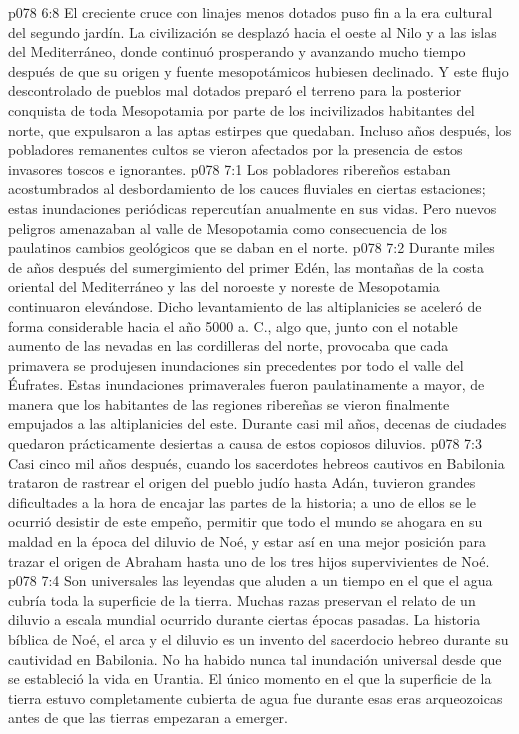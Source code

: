 \vs p078 6:8 El creciente cruce con linajes menos dotados puso fin a la era cultural del segundo jardín. La civilización se desplazó hacia el oeste al Nilo y a las islas del Mediterráneo, donde continuó prosperando y avanzando mucho tiempo después de que su origen y fuente mesopotámicos hubiesen declinado. Y este flujo descontrolado de pueblos mal dotados preparó el terreno para la posterior conquista de toda Mesopotamia por parte de los incivilizados habitantes del norte, que expulsaron a las aptas estirpes que quedaban. Incluso años después, los pobladores remanentes cultos se vieron afectados por la presencia de estos invasores toscos e ignorantes.
\vs p078 7:1 Los pobladores ribereños estaban acostumbrados al desbordamiento de los cauces fluviales en ciertas estaciones; estas inundaciones periódicas repercutían anualmente en sus vidas. Pero nuevos peligros amenazaban al valle de Mesopotamia como consecuencia de los paulatinos cambios geológicos que se daban en el norte.
\vs p078 7:2 Durante miles de años después del sumergimiento del primer Edén, las montañas de la costa oriental del Mediterráneo y las del noroeste y noreste de Mesopotamia continuaron elevándose. Dicho levantamiento de las altiplanicies se aceleró de forma considerable hacia el año 5000 a. C., algo que, junto con el notable aumento de las nevadas en las cordilleras del norte, provocaba que cada primavera se produjesen inundaciones sin precedentes por todo el valle del Éufrates. Estas inundaciones primaverales fueron paulatinamente a mayor, de manera que los habitantes de las regiones ribereñas se vieron finalmente empujados a las altiplanicies del este. Durante casi mil años, decenas de ciudades quedaron prácticamente desiertas a causa de estos copiosos diluvios.
\vs p078 7:3 \pc Casi cinco mil años después, cuando los sacerdotes hebreos cautivos en Babilonia trataron de rastrear el origen del pueblo judío hasta Adán, tuvieron grandes dificultades a la hora de encajar las partes de la historia; a uno de ellos se le ocurrió desistir de este empeño, permitir que todo el mundo se ahogara en su maldad en la época del diluvio de Noé, y estar así en una mejor posición para trazar el origen de Abraham hasta uno de los tres hijos supervivientes de Noé.
\vs p078 7:4 Son universales las leyendas que aluden a un tiempo en el que el agua cubría toda la superficie de la tierra. Muchas razas preservan el relato de un diluvio a escala mundial ocurrido durante ciertas épocas pasadas. La historia bíblica de Noé, el arca y el diluvio es un invento del sacerdocio hebreo durante su cautividad en Babilonia. No ha habido nunca tal inundación universal desde que se estableció la vida en Urantia. El único momento en el que la superficie de la tierra estuvo completamente cubierta de agua fue durante esas eras arqueozoicas antes de que las tierras empezaran a emerger.
